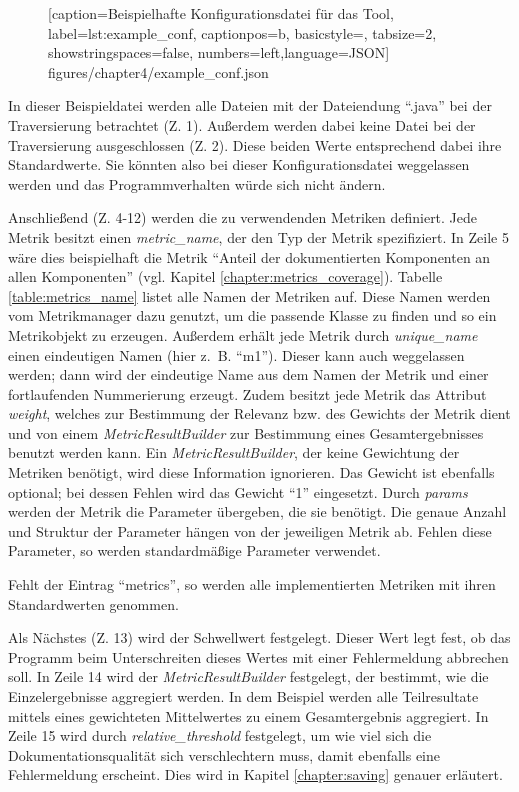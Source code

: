 \begin{figure} [htbp]

[caption={Beispielhafte Konfigurationsdatei für das Tool},
label={lst:example_conf},
captionpos=b, basicstyle=\footnotesize, tabsize=2, showstringspaces=false,  numbers=left,language=JSON]
{figures/chapter4/example_conf.json}
\end{figure}

In dieser Beispieldatei  werden alle Dateien mit der Dateiendung \enquote{.java} bei der Traversierung betrachtet (Z. 1). Außerdem werden dabei keine Datei bei der Traversierung ausgeschlossen (Z. 2). Diese beiden Werte entsprechend dabei ihre Standardwerte. Sie könnten also bei dieser Konfigurationsdatei weggelassen werden und das Programmverhalten würde sich nicht ändern.

Anschließend (Z. 4-12) werden die zu verwendenden Metriken definiert. Jede Metrik besitzt einen \textit{metric\_name}, der den Typ der Metrik spezifiziert. In Zeile 5 wäre dies beispielhaft die Metrik \enquote{Anteil der dokumentierten Komponenten an allen Komponenten} (vgl. Kapitel \ref{chapter:metrics_coverage}). Tabelle \ref{table:metrics_name} listet alle Namen der Metriken auf. Diese Namen werden vom Metrikmanager dazu genutzt, um die passende Klasse zu finden und so ein Metrikobjekt zu erzeugen. Außerdem erhält jede Metrik durch \textit{unique\_name} einen eindeutigen Namen (hier z.~B. \enquote{m1}). Dieser kann auch weggelassen werden; dann wird der eindeutige Name aus dem Namen der Metrik und einer fortlaufenden Nummerierung erzeugt. Zudem besitzt jede Metrik das Attribut \textit{weight}, welches zur Bestimmung der Relevanz bzw. des Gewichts der Metrik dient und von einem \textit{MetricResultBuilder} zur Bestimmung eines Gesamtergebnisses benutzt werden kann. Ein \textit{MetricResultBuilder}, der keine Gewichtung der Metriken benötigt, wird diese Information ignorieren. Das Gewicht ist ebenfalls optional; bei dessen Fehlen wird das Gewicht \enquote{1} eingesetzt.  Durch \textit{params}  werden der Metrik die Parameter übergeben, die sie benötigt. Die genaue Anzahl und Struktur der Parameter hängen von der jeweiligen Metrik ab. Fehlen diese Parameter, so werden standardmäßige Parameter verwendet.

Fehlt der Eintrag \enquote{metrics}, so werden alle implementierten Metriken mit ihren Standardwerten genommen.

Als Nächstes (Z. 13) wird der Schwellwert festgelegt. Dieser Wert legt fest, ob das Programm beim Unterschreiten dieses Wertes mit einer Fehlermeldung abbrechen soll. In Zeile 14 wird der \textit{MetricResultBuilder} festgelegt, der bestimmt, wie die Einzelergebnisse aggregiert werden. In dem Beispiel werden alle Teilresultate mittels eines gewichteten Mittelwertes zu einem Gesamtergebnis aggregiert.  In Zeile 15 wird durch \textit{ relative\_threshold } festgelegt, um wie viel sich die Dokumentationsqualität sich verschlechtern muss, damit ebenfalls eine Fehlermeldung erscheint. Dies wird in Kapitel \ref{chapter:saving} genauer erläutert.

